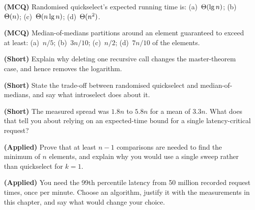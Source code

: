 \begin{reviewq}
  \item \textbf{(MCQ)} Randomised quickselect's expected running time is:
        (a)~$\Theta(\operatorname{lg} n)$; (b)~$\Theta(n)$; (c)~$\Theta(n\operatorname{lg} n)$;
        (d)~$\Theta(n^{2})$.
  \item \textbf{(MCQ)} Median-of-medians partitions around an element
        guaranteed to exceed at least: (a)~$n/5$; (b)~$3n/10$; (c)~$n/2$;
        (d)~$7n/10$ of the elements.
  \item \textbf{(Short)} Explain why deleting one recursive call changes the
        master-theorem case, and hence removes the logarithm.
  \item \textbf{(Short)} State the trade-off between randomised quickselect and
        median-of-medians, and say what introselect does about it.
  \item \textbf{(Short)} The measured spread was $1.8n$ to $5.8n$ for a mean of
        $3.3n$. What does that tell you about relying on an expected-time
        bound for a single latency-critical request?
  \item \textbf{(Applied)} Prove that at least $n-1$ comparisons are needed to
        find the minimum of $n$ elements, and explain why you would use a
        single sweep rather than quickselect for $k = 1$.
  \item \textbf{(Applied)} You need the 99th percentile latency from 50 million
        recorded request times, once per minute. Choose an algorithm, justify
        it with the measurements in this chapter, and say what would change
        your choice.
\end{reviewq}
